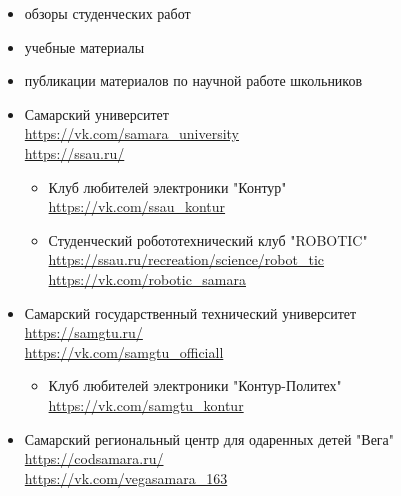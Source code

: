 

\begin{itemize}[nosep]
\item обзоры студенческих работ
\item учебные материалы
\item публикации материалов по научной работе школьников
\end{itemize}


\begin{itemize}

\item Самарский университет
  \\\url{https://vk.com/samara_university}
  \\\url{https://ssau.ru/}

  \begin{itemize}

    \item Клуб любителей электроники "Контур"
    \\\url{https://vk.com/ssau_kontur}

  \item Студенческий робототехнический клуб "ROBOTIC"
    \\\url{https://ssau.ru/recreation/science/robot_tic}
    \\\url{https://vk.com/robotic_samara}

  \end{itemize}

  \item Самарский государственный технический университет
  \\\url{https://samgtu.ru/}
  \\\url{https://vk.com/samgtu_officiall}

  \begin{itemize}

    \item Клуб любителей электроники "Контур-Политех"
    \\\url{https://vk.com/samgtu_kontur}

\end{itemize}

\item Самарский региональный центр для одаренных детей "Вега"
  \\\url{https://codsamara.ru/}
  \\\url{https://vk.com/vegasamara_163}


\end{itemize}

